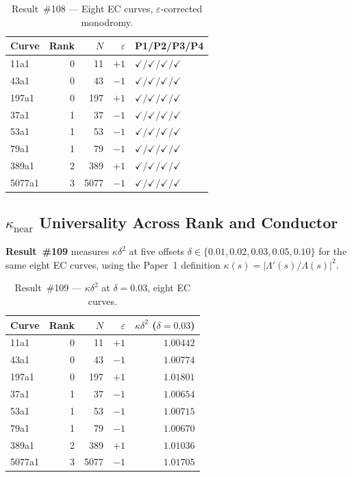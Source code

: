 \documentclass[11pt, a4paper]{article}
\theoremstyle{plain}
\theoremstyle{definition}
\begin{document}
\begin{table}[ht]
\centering
\caption{Result~\#108 — Eight EC curves, $\varepsilon$-corrected monodromy.}
\label{tab:ec108}
\small
\begin{tabular}{lrrrl}
\toprule
Curve & Rank & $N$ & $\varepsilon$ & P1/P2/P3/P4 \\
\midrule
11a1  & 0 & 11   & $+1$ & $\checkmark/\checkmark/\checkmark/\checkmark$ \\
43a1  & 0 & 43   & $-1$ & $\checkmark/\checkmark/\checkmark/\checkmark$ \\
197a1 & 0 & 197  & $+1$ & $\checkmark/\checkmark/\checkmark/\checkmark$ \\
37a1  & 1 & 37   & $-1$ & $\checkmark/\checkmark/\checkmark/\checkmark$ \\
53a1  & 1 & 53   & $-1$ & $\checkmark/\checkmark/\checkmark/\checkmark$ \\
79a1  & 1 & 79   & $-1$ & $\checkmark/\checkmark/\checkmark/\checkmark$ \\
389a1 & 2 & 389  & $+1$ & $\checkmark/\checkmark/\checkmark/\checkmark$ \\
5077a1& 3 & 5077 & $-1$ & $\checkmark/\checkmark/\checkmark/\checkmark$ \\
\bottomrule
\end{tabular}
\end{table}


\subsection{$\kappa_{\mathrm{near}}$ Universality Across Rank and Conductor}
\label{ssec:thm5}

\textbf{Result~\#109} measures $\kappa\delta^{2}$ at five offsets
$\delta\in\{0.01,0.02,0.03,0.05,0.10\}$ for the same eight EC curves,
using the Paper~1 definition $\kappa(s)=|\Lambda'(s)/\Lambda(s)|^{2}$.

\begin{table}[ht]
\centering
\caption{Result~\#109 — $\kappa\delta^{2}$ at $\delta=0.03$, eight EC curves.}
\label{tab:ec109}
\small
\begin{tabular}{lrrrr}
\toprule
Curve & Rank & $N$ & $\varepsilon$ & $\kappa\delta^{2}$ ($\delta=0.03$) \\
\midrule
11a1   & 0 & 11    & $+1$ & $1.00442$ \\
43a1   & 0 & 43    & $-1$ & $1.00774$ \\
197a1  & 0 & 197   & $+1$ & $1.01801$ \\
37a1   & 1 & 37    & $-1$ & $1.00654$ \\
53a1   & 1 & 53    & $-1$ & $1.00715$ \\
79a1   & 1 & 79    & $-1$ & $1.00670$ \\
389a1  & 2 & 389   & $+1$ & $1.01036$ \\
5077a1 & 3 & 5077  & $-1$ & $1.01705$ \\
\bottomrule
\end{tabular}
\end{table}
\end{document}

